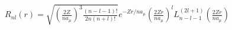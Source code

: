 \documentclass[12pt,fleqn,paper=a4]{exam}
\begin{document}
$
R_{nl }(r)={\sqrt {{({\frac {2Z}{na_{\mu }}})}^{3}{\frac {(n-l -1)!}{2n{(n+l )!}}}}}e^{-Zr/{na_{\mu }}}({\frac {2Zr}{na_{\mu }}})^{l }L_{n-l-1}^{(2l +1)}({\frac {2Zr}{na_{\mu }}})
$
\end{document}
